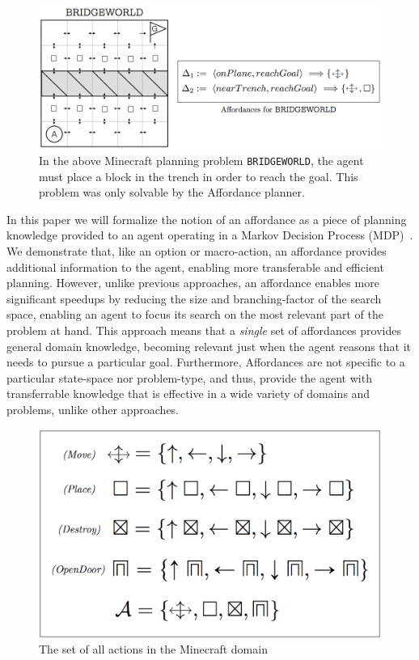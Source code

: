 \documentclass[]{article}
\begin{document}
\begin{figure}
\centering
\includegraphics[scale = 0.18]{figures/bridgeworld_aff.png}
\caption{In the above Minecraft planning problem \texttt{BRIDGEWORLD}, the agent must place a block in the trench in order to reach the goal. This problem was only solvable by the Affordance planner.\label{fig:bridgeworld_aff}}
\end{figure}

In this paper we will formalize
the notion of an affordance as a piece of planning knowledge provided
to an agent operating in a Markov Decision Process
(MDP)~\citep{kaelbling99}.  We demonstrate that, like an option or
macro-action, an affordance provides additional information to the
agent, enabling more transferable and efficient planning.  However, unlike previous
approaches, an affordance enables more significant speedups by
reducing the size and branching-factor of the search space, enabling
an agent to focus its search on the most relevant part of the problem
at hand.  This approach means that a {\em single} set of affordances
provides general domain knowledge, becoming relevant just when the
agent reasons that it needs to pursue a particular goal.  Furthermore,
Affordances are not specific to a particular state-space nor problem-type, and thus, provide
the agent with transferrable knowledge that is effective in a wide variety of
domains and problems, unlike other approaches.


\begin{figure}
\centering
\includegraphics[scale = 0.15]{figures/all_actions.png}
\caption{The set of all actions in the Minecraft domain \label{fig:all_actions}}
\end{figure}
\end{document}
